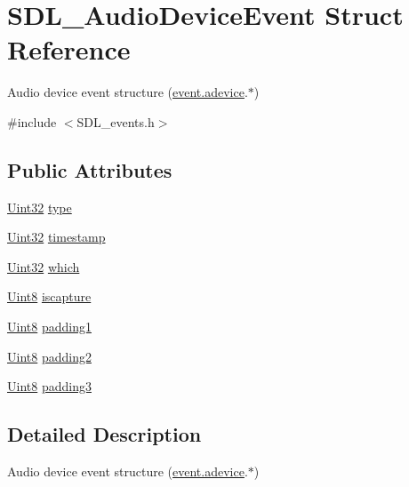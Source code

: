 \hypertarget{struct_s_d_l___audio_device_event}{}\section{S\+D\+L\+\_\+\+Audio\+Device\+Event Struct Reference}
\label{struct_s_d_l___audio_device_event}


Audio device event structure (\hyperlink{union_s_d_l___event_a111e01fcac4fd8e251a6058ff9f17e72}{event.\+adevice}.$\ast$)  




{\ttfamily \#include $<$S\+D\+L\+\_\+events.\+h$>$}

\subsection*{Public Attributes}
\begin{DoxyCompactItemize}
\item 
\hyperlink{_s_d_l__stdinc_8h_add440eff171ea5f55cb00c4a9ab8672d}{Uint32} \hyperlink{struct_s_d_l___audio_device_event_ae68c3bd49b49608711a17395c7cbfe58}{type}
\item 
\hyperlink{_s_d_l__stdinc_8h_add440eff171ea5f55cb00c4a9ab8672d}{Uint32} \hyperlink{struct_s_d_l___audio_device_event_aa471680486a6103eafc9af569016df57}{timestamp}
\item 
\hyperlink{_s_d_l__stdinc_8h_add440eff171ea5f55cb00c4a9ab8672d}{Uint32} \hyperlink{struct_s_d_l___audio_device_event_ac91d70fd4e1dd596185fed061388896c}{which}
\item 
\hyperlink{_s_d_l__stdinc_8h_a2944638813a090aa23e62f4da842c3e2}{Uint8} \hyperlink{struct_s_d_l___audio_device_event_a1482dcd50b47046ef8e9bfa7cc7457d9}{iscapture}
\item 
\hyperlink{_s_d_l__stdinc_8h_a2944638813a090aa23e62f4da842c3e2}{Uint8} \hyperlink{struct_s_d_l___audio_device_event_ad6efdec7189e735f4a05fc123c0cb723}{padding1}
\item 
\hyperlink{_s_d_l__stdinc_8h_a2944638813a090aa23e62f4da842c3e2}{Uint8} \hyperlink{struct_s_d_l___audio_device_event_adf9bebd56d707860045d31359535a2a4}{padding2}
\item 
\hyperlink{_s_d_l__stdinc_8h_a2944638813a090aa23e62f4da842c3e2}{Uint8} \hyperlink{struct_s_d_l___audio_device_event_af3163ba92c77f08a4f0d8f043f24c96c}{padding3}
\end{DoxyCompactItemize}


\subsection{Detailed Description}
Audio device event structure (\hyperlink{union_s_d_l___event_a111e01fcac4fd8e251a6058ff9f17e72}{event.\+adevice}.$\ast$) 

